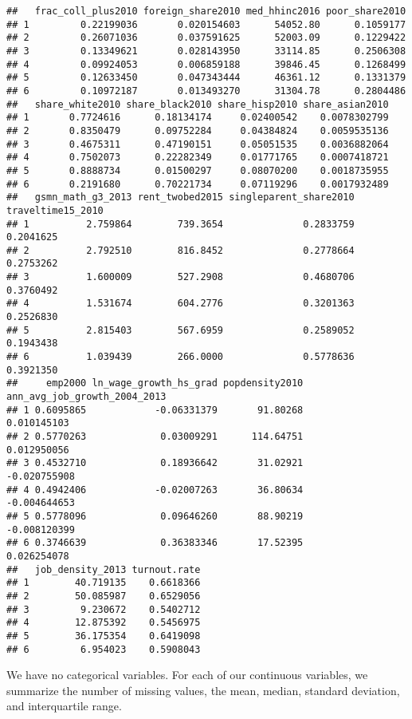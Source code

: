 \documentclass[
]{article}
\begin{document}
\begin{verbatim}
##   frac_coll_plus2010 foreign_share2010 med_hhinc2016 poor_share2010
## 1         0.22199036       0.020154603      54052.80      0.1059177
## 2         0.26071036       0.037591625      52003.09      0.1229422
## 3         0.13349621       0.028143950      33114.85      0.2506308
## 4         0.09924053       0.006859188      39846.45      0.1268499
## 5         0.12633450       0.047343444      46361.12      0.1331379
## 6         0.10972187       0.013493270      31304.78      0.2804486
##   share_white2010 share_black2010 share_hisp2010 share_asian2010
## 1       0.7724616      0.18134174     0.02400542    0.0078302799
## 2       0.8350479      0.09752284     0.04384824    0.0059535136
## 3       0.4675311      0.47190151     0.05051535    0.0036882064
## 4       0.7502073      0.22282349     0.01771765    0.0007418721
## 5       0.8888734      0.01500297     0.08070200    0.0018735955
## 6       0.2191680      0.70221734     0.07119296    0.0017932489
##   gsmn_math_g3_2013 rent_twobed2015 singleparent_share2010 traveltime15_2010
## 1          2.759864        739.3654              0.2833759         0.2041625
## 2          2.792510        816.8452              0.2778664         0.2753262
## 3          1.600009        527.2908              0.4680706         0.3760492
## 4          1.531674        604.2776              0.3201363         0.2526830
## 5          2.815403        567.6959              0.2589052         0.1943438
## 6          1.039439        266.0000              0.5778636         0.3921350
##     emp2000 ln_wage_growth_hs_grad popdensity2010 ann_avg_job_growth_2004_2013
## 1 0.6095865            -0.06331379       91.80268                  0.010145103
## 2 0.5770263             0.03009291      114.64751                  0.012950056
## 3 0.4532710             0.18936642       31.02921                 -0.020755908
## 4 0.4942406            -0.02007263       36.80634                 -0.004644653
## 5 0.5778096             0.09646260       88.90219                 -0.008120399
## 6 0.3746639             0.36383346       17.52395                  0.026254078
##   job_density_2013 turnout.rate
## 1        40.719135    0.6618366
## 2        50.085987    0.6529056
## 3         9.230672    0.5402712
## 4        12.875392    0.5456975
## 5        36.175354    0.6419098
## 6         6.954023    0.5908043
\end{verbatim}

We have no categorical variables. For each of our continuous variables,
we summarize the number of missing values, the mean, median, standard
deviation, and interquartile range.
\end{document}
